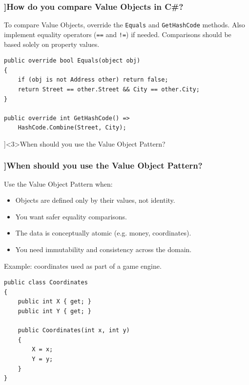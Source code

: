 \begin{frame}[fragile]
  \frametitle{\AnswerTitle[\CategoryBadge[OOPColor!20]{Design Patterns}]{How do you compare Value Objects in C\#?}}

  {\footnotesize
  To compare Value Objects, override the \texttt{Equals} and \texttt{GetHashCode} methods. Also implement equality operators (\texttt{==} and \texttt{!=}) if needed. Comparisons should be based solely on property values.
  }

  \begin{verbatim}
public override bool Equals(object obj)
{
    if (obj is not Address other) return false;
    return Street == other.Street && City == other.City;
}

public override int GetHashCode() =>
    HashCode.Combine(Street, City);
  \end{verbatim}
\end{frame}

\QuestionSlide[\CategoryBadge[OOPColor!20]{Design Patterns}]<3>{When should you use the Value Object Pattern?}

\begin{frame}[fragile]
  \frametitle{\AnswerTitle[\CategoryBadge[OOPColor!20]{Design Patterns}]{When should you use the Value Object Pattern?}}

  {\footnotesize
  Use the Value Object Pattern when:
  \begin{itemize}
    \item Objects are defined only by their values, not identity.
    \item You want safer equality comparisons.
    \item The data is conceptually atomic (e.g. money, coordinates).
    \item You need immutability and consistency across the domain.
  \end{itemize}
  Example: coordinates used as part of a game engine.
  }

  \begin{verbatim}
public class Coordinates
{
    public int X { get; }
    public int Y { get; }

    public Coordinates(int x, int y)
    {
        X = x;
        Y = y;
    }
}
  \end{verbatim}
\end{frame}
